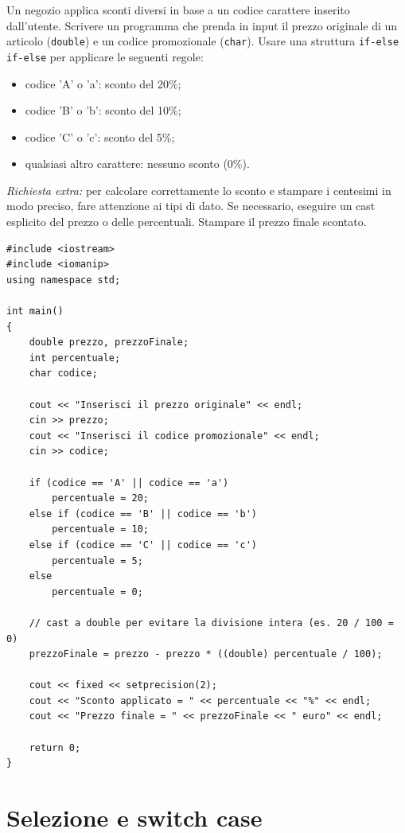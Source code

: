 \documentclass[11pt,fleqn]{book}
\begin{document}
\begin{esercizio}[2]
    Un negozio applica sconti diversi in base a un codice carattere inserito dall'utente. Scrivere un programma che prenda in input il prezzo originale di un articolo (\texttt{double}) e un codice promozionale (\texttt{char}). Usare una struttura \texttt{if-else if-else} per applicare le seguenti regole:
    \begin{itemize}
        \item codice 'A' o 'a': sconto del 20\%;
        \item codice 'B' o 'b': sconto del 10\%;
        \item codice 'C' o 'c': sconto del 5\%;
        \item qualsiasi altro carattere: nessuno sconto (0\%).
    \end{itemize}
    \textit{Richiesta extra:} per calcolare correttamente lo sconto e stampare i centesimi in modo preciso, fare attenzione ai tipi di dato. Se necessario, eseguire un cast esplicito del prezzo o delle percentuali. Stampare il prezzo finale scontato.
    \ifsoluzioni
    \solution
    \begin{lstlisting}[style=cpp]
#include <iostream>
#include <iomanip>
using namespace std;

int main()
{
    double prezzo, prezzoFinale;
    int percentuale;
    char codice;

    cout << "Inserisci il prezzo originale" << endl;
    cin >> prezzo;
    cout << "Inserisci il codice promozionale" << endl;
    cin >> codice;

    if (codice == 'A' || codice == 'a')
        percentuale = 20;
    else if (codice == 'B' || codice == 'b')
        percentuale = 10;
    else if (codice == 'C' || codice == 'c')
        percentuale = 5;
    else
        percentuale = 0;

    // cast a double per evitare la divisione intera (es. 20 / 100 = 0)
    prezzoFinale = prezzo - prezzo * ((double) percentuale / 100);

    cout << fixed << setprecision(2);
    cout << "Sconto applicato = " << percentuale << "%" << endl;
    cout << "Prezzo finale = " << prezzoFinale << " euro" << endl;

    return 0;
}
    \end{lstlisting}
    \fi
\end{esercizio}

\newpage

\section{Selezione e switch case}
\end{document}
